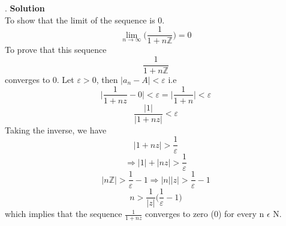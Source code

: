 \documentclass[a4paper, 12pt]{report}
\begin{document}
{\begin{equation*}
\end{equation*}.
\textbf{Solution}\\
To show that the limit of the sequence is 0.
\begin{equation*}
\lim_{n\rightarrow\infty}\bigg(\frac{1}{1 + n\mathbb{Z}}\bigg) = 0
\end{equation*}
To prove that this sequence 
\begin{equation*}
\frac{1}{1 + n\mathbb{Z}}
\end{equation*}
converges to 0. Let $\varepsilon > 0$, then $|a_n - A| < \varepsilon$ i.e
\begin{equation*}
\bigg|\frac{1}{1 + nz} - 0\bigg| < \varepsilon = \bigg|\frac{1}{1 + n}\bigg| < \varepsilon
\end{equation*}
\begin{equation*}
\frac{|1|}{|1 + nz|} < \varepsilon
\end{equation*}
Taking the inverse, we have
\begin{equation*}
|1 + nz| > \frac{1}{\varepsilon}
\end{equation*}
\begin{equation*}
\Rightarrow |1| + |nz| > \frac{1}{\varepsilon}
\end{equation*}
\begin{equation*}
|n\mathbb{Z}| > \frac{1}{\varepsilon} - 1 \Rightarrow |n||z| > \frac{1}{\varepsilon} - 1
\end{equation*}
\begin{equation*}
n > \frac{1}{|z|}\bigg(\frac{1}{\varepsilon} - 1\bigg)
\end{equation*}
which implies that the sequence $\frac{1}{1 + nz}$ converges to zero (0) for every n $\epsilon$ N.
\newpage
}
\end{document}
